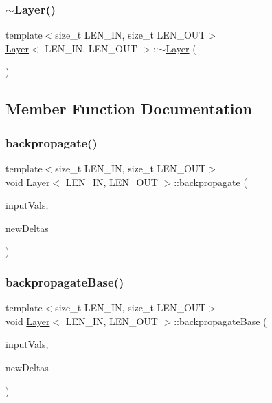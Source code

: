 \subsubsection{\texorpdfstring{$\sim$\+Layer()}{~Layer()}}
{\footnotesize\ttfamily template$<$size\+\_\+t L\+E\+N\+\_\+\+IN, size\+\_\+t L\+E\+N\+\_\+\+O\+UT$>$ \\
\hyperlink{class_layer}{Layer}$<$ L\+E\+N\+\_\+\+IN, L\+E\+N\+\_\+\+O\+UT $>$\+::$\sim$\hyperlink{class_layer}{Layer} (\begin{DoxyParamCaption}{ }\end{DoxyParamCaption})\hspace{0.3cm}{\ttfamily [inline]}}



\subsection{Member Function Documentation}
\mbox{\label{class_layer_a7f77b112096ae4aeeddc218f8c6aa707}} 
\subsubsection{\texorpdfstring{backpropagate()}{backpropagate()}}
{\footnotesize\ttfamily template$<$size\+\_\+t L\+E\+N\+\_\+\+IN, size\+\_\+t L\+E\+N\+\_\+\+O\+UT$>$ \\
void \hyperlink{class_layer}{Layer}$<$ L\+E\+N\+\_\+\+IN, L\+E\+N\+\_\+\+O\+UT $>$\+::backpropagate (\begin{DoxyParamCaption}\item[{array$<$ double, L\+E\+N\+\_\+\+IN $>$}]{input\+Vals,  }\item[{array$<$ double, L\+E\+N\+\_\+\+O\+UT $>$}]{new\+Deltas }\end{DoxyParamCaption})\hspace{0.3cm}{\ttfamily [inline]}}

\mbox{\label{class_layer_a9eab88a84b81d25ba8327e94d5a61bd9}} 
\subsubsection{\texorpdfstring{backpropagate\+Base()}{backpropagateBase()}}
{\footnotesize\ttfamily template$<$size\+\_\+t L\+E\+N\+\_\+\+IN, size\+\_\+t L\+E\+N\+\_\+\+O\+UT$>$ \\
void \hyperlink{class_layer}{Layer}$<$ L\+E\+N\+\_\+\+IN, L\+E\+N\+\_\+\+O\+UT $>$\+::backpropagate\+Base (\begin{DoxyParamCaption}\item[{array$<$ double, L\+E\+N\+\_\+\+IN $>$}]{input\+Vals,  }\item[{array$<$ double, L\+E\+N\+\_\+\+O\+UT $>$}]{new\+Deltas }\end{DoxyParamCaption})\hspace{0.3cm}{\ttfamily [inline]}}

